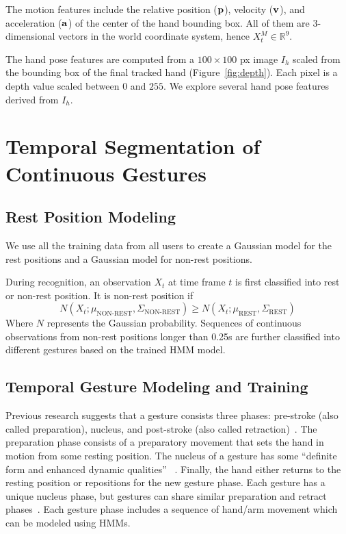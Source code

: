 \documentclass{acm_proc_article-sp}
\begin{document}
The motion features include the relative position ($\bf{p}$), velocity ($\bf{v}$),
and acceleration ($\bf{a}$) of the center of
the hand bounding box.
All of them are 3-dimensional vectors in the world
coordinate system, hence $X_t^M\in\mathbb{R}^9$. 

The hand pose features are computed from a $100 \times 100$ px image $I_{h}$ scaled
from the bounding box of the final tracked hand (Figure~\ref{fig:depth}). Each pixel
is a depth value scaled between $0$ and $255$. We explore several hand pose 
features derived from $I_h$.

\section{Temporal Segmentation of Continuous Gestures}\label{sec:recognition}
\subsection{Rest Position Modeling}
We use all the training data from all users to create a Gaussian model for the rest 
positions and a Gaussian model for non-rest positions.

During recognition, an observation $X_t$ at time frame $t$ is first classified into 
rest or non-rest position. It is non-rest position if 
\begin{displaymath}
N(X_t; \mu_{\text{NON-REST}}, \Sigma_{\text{NON-REST}}) \geq N(X_t; \mu_{\text{REST}}, \Sigma_{\text{REST}})
\end{displaymath}
Where $N$ represents the Gaussian probability. Sequences of continuous observations from non-rest
positions longer than 0.25s are further classified into different gestures based on the trained HMM model.
 
\subsection{Temporal Gesture Modeling and Training}
Previous research suggests that
a gesture consists three phases: pre-stroke (also called preparation), nucleus, and post-stroke 
(also called retraction)~\cite{Pavlovic97}. The preparation phase consists
of a preparatory movement that sets the hand in motion from some resting position.
The nucleus of a gesture has some ``definite form and enhanced dynamic qualities''
~\cite{kendon86}. Finally, the hand either returns to the resting position or repositions
for the new gesture phase. Each gesture has a unique nucleus phase, but gestures can
share similar preparation and retract phases~\cite{krahnstoever2002}. Each gesture
phase includes a sequence of hand/arm movement which can be modeled using HMMs. 
\end{document}
